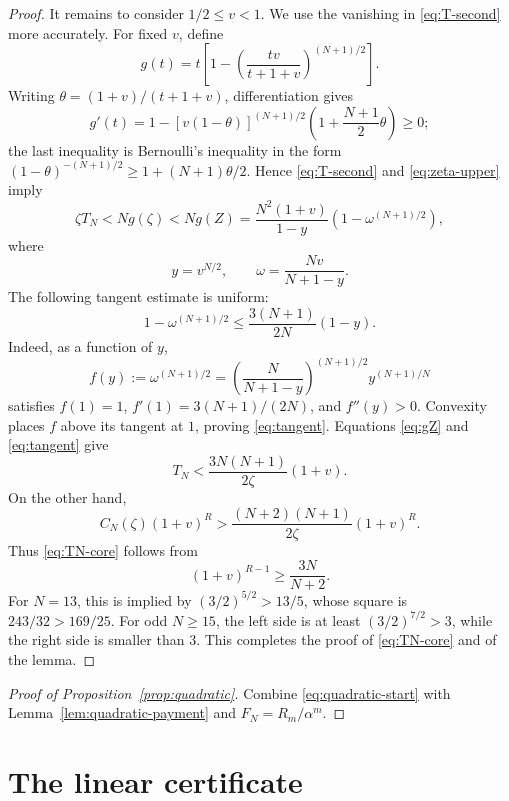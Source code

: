 \documentclass[11pt]{article}
\begin{document}
\begin{proof}
It remains to consider \(1/2\le v<1\).  We use the vanishing in
\eqref{eq:T-second} more accurately.  For fixed \(v\), define
\[
 g(t)=t\left[1-
 \left(\frac{tv}{t+1+v}\right)^{(N+1)/2}\right].
\]
Writing \(\theta=(1+v)/(t+1+v)\), differentiation gives
\[
 g'(t)=1-[v(1-\theta)]^{(N+1)/2}
 \left(1+\frac{N+1}{2}\theta\right)\ge0;
\]
the last inequality is Bernoulli's inequality in the form
\((1-\theta)^{-(N+1)/2}\ge1+(N+1)\theta/2\).
Hence \eqref{eq:T-second} and \eqref{eq:zeta-upper} imply
\begin{equation}\label{eq:gZ}
 \zeta T_N<N g(\zeta)<N g(Z)
 =\frac{N^2(1+v)}{1-y}(1-\omega^{(N+1)/2}),
\end{equation}
where
\[
        y=v^{N/2},\qquad
        \omega=\frac{Nv}{N+1-y}.
\]
The following tangent estimate is uniform:
\begin{equation}\label{eq:tangent}
 1-\omega^{(N+1)/2}
 \le\frac{3(N+1)}{2N}(1-y).
\end{equation}
Indeed, as a function of \(y\),
\[
 f(y):=\omega^{(N+1)/2}
 =\left(\frac{N}{N+1-y}\right)^{(N+1)/2}
  y^{(N+1)/N}
\]
satisfies \(f(1)=1\), \(f'(1)=3(N+1)/(2N)\), and \(f''(y)>0\).
Convexity places \(f\) above its tangent at \(1\), proving
\eqref{eq:tangent}.  Equations \eqref{eq:gZ} and \eqref{eq:tangent} give
\[
        T_N<\frac{3N(N+1)}{2\zeta}(1+v).
\]
On the other hand,
\[
 C_N(\zeta)(1+v)^R>
 \frac{(N+2)(N+1)}{2\zeta}(1+v)^R.
\]
Thus \eqref{eq:TN-core} follows from
\[
 (1+v)^{R-1}\ge\frac{3N}{N+2}.
\]
For \(N=13\), this is implied by
\((3/2)^{5/2}>13/5\), whose square is
\(243/32>169/25\).  For odd \(N\ge15\), the left side is at least
\((3/2)^{7/2}>3\), while the right side is smaller than \(3\).
This completes the proof of \eqref{eq:TN-core} and of the lemma.
\end{proof}

\begin{proof}[Proof of Proposition~\ref{prop:quadratic}]
Combine \eqref{eq:quadratic-start} with
Lemma~\ref{lem:quadratic-payment} and \(F_N=R_m/\alpha^m\).
\end{proof}

\section{The linear certificate}\label{sec:linear}
\end{document}
